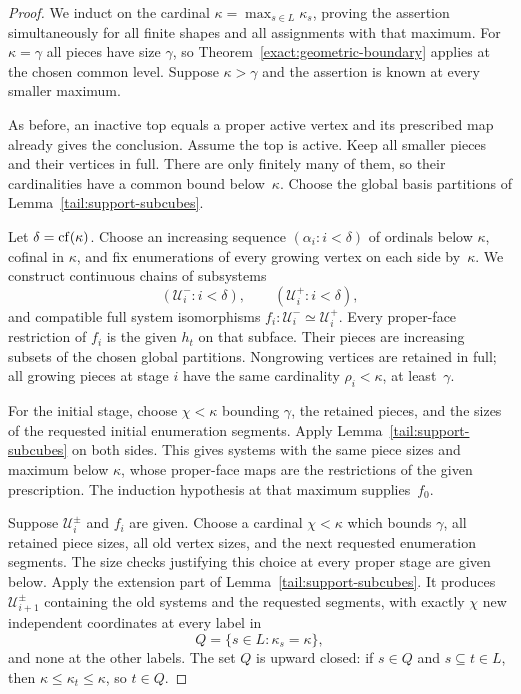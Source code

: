 \begin{proof}
We induct on the cardinal
$\kappa=\max_{s\in L}\kappa_s$, proving the assertion
simultaneously for all finite shapes and all assignments with
that maximum.  For $\kappa=\gamma$ all pieces have size
$\gamma$, so Theorem~\ref{exact:geometric-boundary} applies at
the chosen common level.  Suppose $\kappa>\gamma$ and the
assertion is known at every smaller maximum.

As before, an inactive top equals a proper active vertex and its
prescribed map already gives the conclusion.  Assume the top is
active.  Keep all smaller pieces and their vertices in full.
There are only finitely many of them, so their cardinalities
have a common bound below~$\kappa$.  Choose the global basis
partitions of Lemma~\ref{tail:support-subcubes}.

Let $\delta=\operatorname{cf}(\kappa)$.  Choose an increasing sequence
$(\alpha_i:i<\delta)$ of ordinals below $\kappa$, cofinal in
$\kappa$, and fix enumerations of every growing vertex on each
side by~$\kappa$.  We construct continuous chains of subsystems
\[
 (\mathcal U_i^-:i<\delta),\qquad
 (\mathcal U_i^+:i<\delta),
\]
and compatible full system isomorphisms
$f_i:\mathcal U_i^-\simeq\mathcal U_i^+$.
Every proper-face restriction of $f_i$ is the given $h_t$ on
that subface.  Their pieces are increasing subsets of the
chosen global partitions.  Nongrowing vertices are retained
in full; all growing pieces at stage $i$ have the same
cardinality $\rho_i<\kappa$, at least~$\gamma$.

For the initial stage, choose $\chi<\kappa$ bounding $\gamma$,
the retained pieces, and the sizes of the requested initial
enumeration segments.  Apply Lemma~\ref{tail:support-subcubes}
on both sides.  This gives systems with the same piece sizes
and maximum below $\kappa$, whose proper-face maps are the
restrictions of the given prescription.  The induction
hypothesis at that maximum supplies~$f_0$.

Suppose $\mathcal U_i^\pm$ and $f_i$ are given.  Choose a
cardinal $\chi<\kappa$ which bounds $\gamma$, all retained
piece sizes, all old vertex sizes, and the next requested
enumeration segments.  The size checks justifying this choice
at every proper stage are given below.  Apply the extension
part of Lemma~\ref{tail:support-subcubes}.  It produces
$\mathcal U_{i+1}^\pm$ containing the old systems and the
requested segments, with exactly $\chi$ new independent
coordinates at every label in
\[
 Q=\{s\in L:\kappa_s=\kappa\},
\]
and none at the other labels.  The set $Q$ is upward closed:
if $s\in Q$ and $s\subseteq t\in L$, then
$\kappa\leq\kappa_t\leq\kappa$, so $t\in Q$.


\end{proof}
